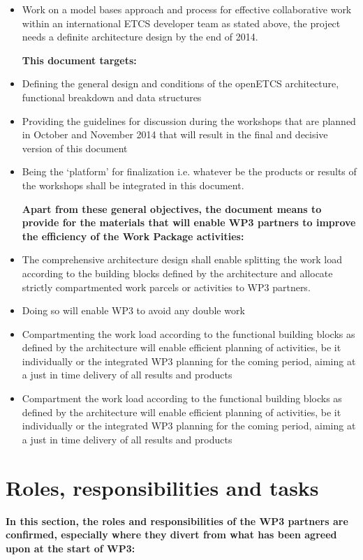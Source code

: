 \begin{itemize}
\item Work on a model bases approach and process for effective collaborative work within an international ETCS developer team as stated above, the project needs a definite architecture design by the end of 2014.

\textbf{This document targets:}
\item Defining the general design and conditions of the openETCS architecture, functional breakdown and data structures
\item Providing the guidelines for discussion during the workshops that are planned in October and November 2014 that will result in the final and decisive version of this document
\item Being the ‘platform’ for finalization i.e. whatever be the products or results of the workshops shall be integrated in this document.

\textbf{Apart from these general objectives, the document means to provide for the materials that will enable WP3 partners to improve the efficiency of the Work Package activities:}
\item The comprehensive architecture design shall enable splitting the work load according to the building blocks defined by the architecture and allocate strictly compartmented work parcels or activities to WP3 partners.
\item Doing so will enable WP3 to avoid any double work
\item  Compartmenting the work load according to the functional building blocks as defined by the architecture will enable efficient planning of activities, be it individually or the integrated WP3 planning for the coming period, aiming at a just in time delivery of all results and products
\item  Compartment the work load according to the functional building blocks as defined by the architecture will enable efficient planning of activities, be it individually or the integrated WP3 planning for the coming period, aiming at a just in time delivery of all results and products
\end{itemize}

\section{Roles, responsibilities and tasks}
\textbf{In this section, the roles and responsibilities of the WP3 partners are confirmed, especially where they divert from what has been agreed upon at the start of WP3:}

